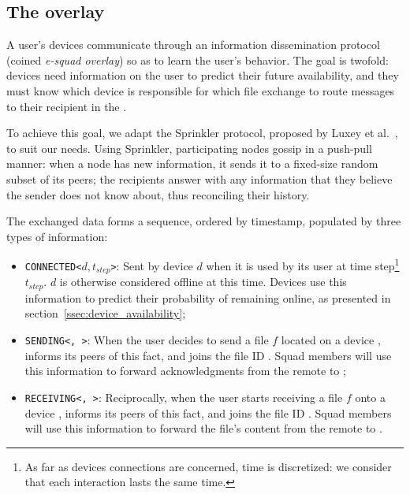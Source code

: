 

\subsection{The \squad overlay}
\label{sec:squad_overlay}

A user's devices communicate through an information dissemination protocol (coined \emph{e-squad overlay}) so as to learn the user's behavior.
The goal is twofold: 
devices need information on the user to predict their future availability, 
and they must know which device is responsible for which file exchange to route messages to their recipient in the \squad.

To achieve this goal, we adapt the Sprinkler protocol, proposed by Luxey et al.~\cite{luxey:hal-01704172}, to suit our needs. 
Using Sprinkler, participating nodes gossip in a push-pull manner: 
when a node has new information, it sends it to a fixed-size random subset of its peers; 
the recipients answer with any information that they believe the sender does not know about, thus reconciling their history.

The exchanged data forms a sequence, ordered by timestamp, populated by three types of information:
\begin{itemize}
	\item \texttt{CONNECTED<$d, t_{step}$>}: Sent by device $d$ when it is used by its user at time step\footnote{As far as devices connections are concerned, time is discretized: we consider that each interaction lasts the same time.} $t_{step}$. $d$ is otherwise considered offline at this time. Devices use this information to predict their probability of remaining online, as presented in section~\ref{ssec:device_availability};
	\item \texttt{SENDING<\sendingdevice, \fileid>}: When the user decides to send a file $f$ located on a device \sendingdevice, \sendingdevice informs its peers of this fact, and joins the file ID \fileid. Squad members will use this information to forward acknowledgments from the remote to \sendingdevice;
	\item \texttt{RECEIVING<\recdevice, \fileid>}: Reciprocally, when the user starts receiving a file $f$ onto a device \recdevice, \recdevice informs its peers of this fact, and joins the file ID \fileid. Squad members will use this information to forward the file's content from the remote to \recdevice.
\end{itemize}

